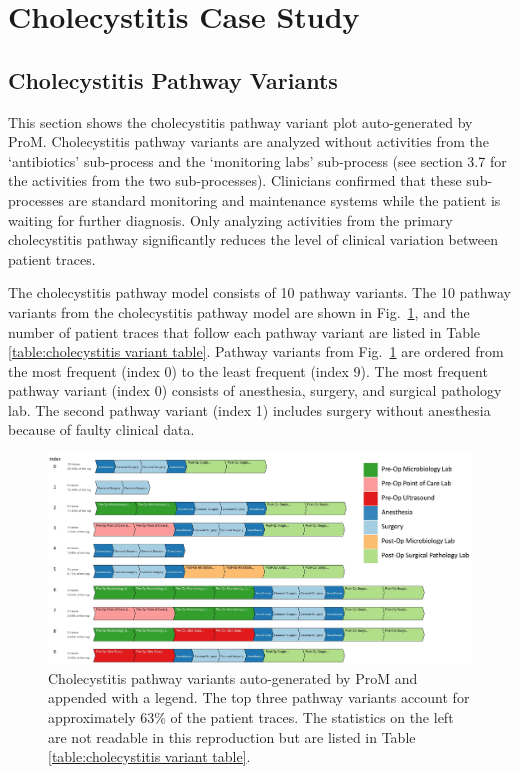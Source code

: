 \section{Cholecystitis Case Study}
\label{sec:Cholecystitis}
\subsection{Cholecystitis Pathway Variants}
This section shows the cholecystitis pathway variant plot auto-generated by ProM. Cholecystitis pathway variants are analyzed without activities from the `antibiotics' sub-process and the `monitoring labs' sub-process (see section 3.7 for the activities from the two sub-processes). Clinicians confirmed that these sub-processes are standard monitoring and maintenance systems while the patient is waiting for further diagnosis. Only analyzing activities from the primary cholecystitis pathway significantly reduces the level of clinical variation between patient traces.

The cholecystitis pathway model consists of 10 pathway variants. The 10 pathway variants from the cholecystitis pathway model are shown in Fig.~\ref{fig:cholecystitis pathway variants}, and the number of patient traces that follow each pathway variant are listed in Table \ref{table:cholecystitis variant table}. Pathway variants from Fig.~\ref{fig:cholecystitis pathway variants} are ordered from the most frequent (index 0) to the least frequent (index 9). The most frequent pathway variant (index 0) consists of anesthesia, surgery, and surgical pathology lab. The second pathway variant (index 1) includes surgery without anesthesia because of faulty clinical data.

\begin{figure}[t]
\hspace{-2cm}
\includegraphics[width=1.5\textwidth]{images/cholecystitis_variant_index_anes.jpg}
\caption{Cholecystitis pathway variants auto-generated by ProM and appended with a legend. The top three pathway variants account for approximately 63\% of the patient traces. The statistics on the left are not readable in this reproduction but are listed in Table \ref{table:cholecystitis variant table}.}
\label{fig:cholecystitis pathway variants}
\end{figure}


